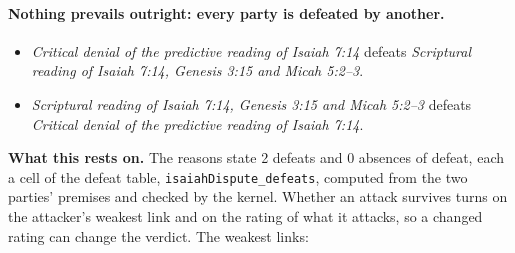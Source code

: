 \documentclass[11pt]{article}
\begin{document}
\paragraph{Nothing prevails outright: every party is defeated by another.}
\begin{itemize}
\item \emph{Critical denial of the predictive reading of Isaiah 7:14} defeats \emph{Scriptural reading of Isaiah 7:14, Genesis 3:15 and Micah 5:2–3}.
\item \emph{Scriptural reading of Isaiah 7:14, Genesis 3:15 and Micah 5:2–3} defeats \emph{Critical denial of the predictive reading of Isaiah 7:14}.
\end{itemize}
\par\noindent\textbf{What this rests on.} The reasons state 2 defeats and 0 absences of defeat, each a cell of the defeat table, \texttt{isaiah\allowbreak{}Dispute\_\allowbreak{}defeats}, computed from the two parties' premises and checked by the kernel. Whether an attack survives turns on the attacker's weakest link and on the rating of what it attacks, so a changed rating can change the verdict. The weakest links:
\end{document}
